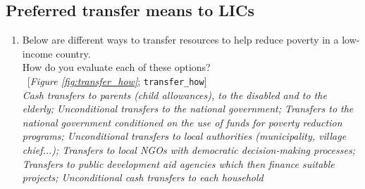  \subsection*{Preferred transfer means to LICs} 
 \begin{enumerate}[resume] 
\item  \label{q:transfer_how} Below are different ways to transfer resources to help reduce poverty in a low-income country.~\\How do you evaluate each of these options?\\ 
~[\textit{Figure \ref{fig:transfer_how}}; 
\verb|transfer_how|]
  \\ \textit{Cash transfers to parents (child allowances), to the disabled and to the elderly; Unconditional transfers to the national government; Transfers to the national government conditioned on the use of funds for poverty reduction programs; Unconditional transfers to local authorities (municipality, village chief...); Transfers to local NGOs with democratic decision-making processes; Transfers to public development aid agencies which then finance suitable projects; Unconditional cash transfers to each household}

\end{enumerate} 

